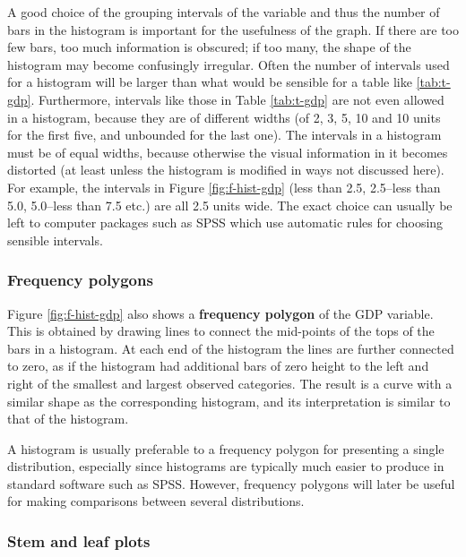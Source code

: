 \documentclass[11pt,a4paper,openany]{book}
\begin{document}
A good choice of the grouping intervals of the variable and thus the
number of bars in the histogram is important for the usefulness of the
graph. If there are too few bars, too much information is obscured; if
too many, the shape of the histogram may become confusingly irregular.
Often the number of intervals used for a histogram will be larger than
what would be sensible for a table like \ref{tab:t-gdp}. Furthermore,
intervals like those in Table \ref{tab:t-gdp} are not even allowed in a
histogram, because they are of different widths (of 2, 3, 5, 10 and 10
units for the first five, and unbounded for the last one). The intervals
in a histogram must be of equal widths, because otherwise the visual
information in it becomes distorted (at least unless the histogram is
modified in ways not discussed here). For example, the intervals in
Figure \ref{fig:f-hist-gdp} (less than 2.5, 2.5--less than 5.0,
5.0--less than 7.5 etc.) are all 2.5 units wide. The exact choice can
usually be left to computer packages such as SPSS which use automatic
rules for choosing sensible intervals.

\subsubsection*{Frequency polygons}\label{frequency-polygons}

Figure \ref{fig:f-hist-gdp} also shows a \textbf{frequency polygon} of
the GDP variable. This is obtained by drawing lines to connect the
mid-points of the tops of the bars in a histogram. At each end of the
histogram the lines are further connected to zero, as if the histogram
had additional bars of zero height to the left and right of the smallest
and largest observed categories. The result is a curve with a similar
shape as the corresponding histogram, and its interpretation is similar
to that of the histogram.

A histogram is usually preferable to a frequency polygon for presenting
a single distribution, especially since histograms are typically much
easier to produce in standard software such as SPSS. However, frequency
polygons will later be useful for making comparisons between several
distributions.

\subsubsection*{Stem and leaf plots}\label{stem-and-leaf-plots}
\end{document}
